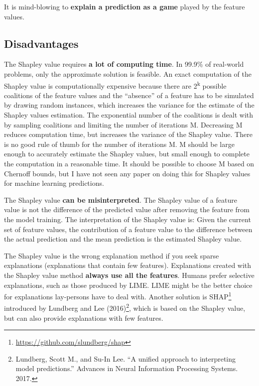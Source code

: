 \documentclass[12pt,]{krantz}
\renewcommand{\href}[2]{#2\footnote{\url{#1}}}
\begin{document}
It is mind-blowing to \textbf{explain a prediction as a game} played by
the feature values.

\subsection{Disadvantages}\label{disadvantages-16}

The Shapley value requires \textbf{a lot of computing time}. In 99.9\%
of real-world problems, only the approximate solution is feasible. An
exact computation of the Shapley value is computationally expensive
because there are 2\textsuperscript{k} possible coalitions of the
feature values and the ``absence'' of a feature has to be simulated by
drawing random instances, which increases the variance for the estimate
of the Shapley values estimation. The exponential number of the
coalitions is dealt with by sampling coalitions and limiting the number
of iterations M. Decreasing M reduces computation time, but increases
the variance of the Shapley value. There is no good rule of thumb for
the number of iterations M. M should be large enough to accurately
estimate the Shapley values, but small enough to complete the
computation in a reasonable time. It should be possible to choose M
based on Chernoff bounds, but I have not seen any paper on doing this
for Shapley values for machine learning predictions.

The Shapley value \textbf{can be misinterpreted}. The Shapley value of a
feature value is not the difference of the predicted value after
removing the feature from the model training. The interpretation of the
Shapley value is: Given the current set of feature values, the
contribution of a feature value to the difference between the actual
prediction and the mean prediction is the estimated Shapley value.

The Shapley value is the wrong explanation method if you seek sparse
explanations (explanations that contain few features). Explanations
created with the Shapley value method \textbf{always use all the
features}. Humans prefer selective explanations, such as those produced
by LIME. LIME might be the better choice for explanations lay-persons
have to deal with. Another solution is
\href{https://github.com/slundberg/shap}{SHAP} introduced by Lundberg
and Lee (2016)\footnote{Lundberg, Scott M., and Su-In Lee. ``A unified
  approach to interpreting model predictions.'' Advances in Neural
  Information Processing Systems. 2017.}, which is based on the Shapley
value, but can also provide explanations with few features.
\end{document}
